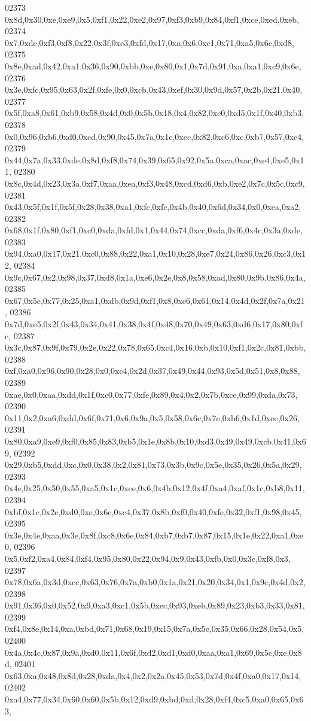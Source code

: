 \begin{DoxyCode}
02373   0x8d,0x30,0xe,0xe9,0x5,0xf1,0x22,0xe2,0x97,0xf3,0xb9,0x84,0xf1,0xce,0xed,0xeb,
02374   0x7,0xdc,0xf3,0xf8,0x22,0x3f,0xe3,0xfd,0x17,0xa,0x6,0xc1,0x71,0xa5,0x6c,0xd8,
02375   0x8e,0xad,0x42,0xa1,0x36,0x90,0xbb,0xe,0x80,0x1,0x7d,0x91,0xa,0xa1,0xc9,0x6e,
02376   0x3e,0xfc,0x95,0x63,0x2f,0xfe,0x0,0xcb,0x43,0xef,0x30,0x9d,0x57,0x2b,0x21,0x40,
02377   0x5f,0xa8,0x61,0xb9,0x58,0x4d,0x0,0x5b,0x18,0x4,0x82,0xc0,0xd5,0x1f,0x40,0xb3,
02378   0x0,0x96,0xb6,0xd0,0xcd,0x90,0x45,0x7a,0x1e,0xec,0x82,0xc6,0xc,0xb7,0x57,0xe4,
02379   0x44,0x7a,0x33,0xde,0x8d,0xf8,0x74,0x39,0x65,0x92,0x5a,0xca,0xac,0xe4,0xe5,0x11,
02380   0x8c,0x4d,0x23,0x3a,0xf7,0xaa,0xea,0xf3,0x48,0xcd,0xd6,0xb,0xe2,0x7c,0x5c,0xc9,
02381   0x43,0x5f,0x1f,0x5f,0x28,0x38,0xa1,0xfc,0xfc,0x4b,0x40,0x6d,0x34,0x0,0xea,0xa2,
02382   0x68,0x1f,0x80,0xf1,0xc0,0xda,0xfd,0x1,0x44,0x74,0xcc,0xda,0xf6,0x4c,0x3a,0xde,
02383   0x94,0xa0,0x17,0x21,0xc0,0x88,0x22,0xa1,0x10,0x28,0xe7,0x24,0x86,0x26,0xc3,0x12,
02384   0x9c,0x67,0x2,0x98,0x37,0xd8,0x1a,0xe6,0x2e,0x8,0x58,0xad,0x80,0x9b,0x86,0x4a,
02385   0x67,0x5e,0x77,0x25,0xa1,0xdb,0x9d,0xf1,0x8,0xe6,0x61,0x14,0x4d,0x2f,0x7a,0x21,
02386   0x7d,0xe5,0x2f,0x43,0x34,0x41,0x38,0x4f,0x48,0x70,0x49,0x63,0xd6,0x17,0x80,0xfc,
02387   0x3c,0x87,0x9f,0x79,0x2e,0x22,0x78,0x65,0xc4,0x16,0xb,0x10,0xf1,0x2c,0x81,0xbb,
02388   0xf,0xa0,0x96,0x90,0x28,0x0,0xc4,0x2d,0x37,0x49,0x44,0x93,0x5d,0x51,0x8,0x88,
02389   0xae,0x0,0xaa,0xdd,0x1f,0xc0,0x77,0xfe,0x89,0x4,0x2,0x7b,0xce,0x99,0xda,0x73,
02390   0x11,0x2,0xa6,0xdd,0x6f,0x71,0x6,0x9a,0x5,0x58,0x6c,0x7e,0xb6,0x1d,0xee,0x26,
02391   0x80,0xa9,0xe9,0xf0,0x85,0x83,0xb5,0x1e,0x8b,0x10,0xd3,0x49,0x49,0xcb,0x41,0x69,
02392   0x29,0xb5,0xdd,0xc,0x0,0x38,0x2,0x81,0x73,0x3b,0x9c,0x5e,0x35,0x26,0x5a,0x29,
02393   0x4e,0x25,0x50,0x55,0xa5,0x1c,0xee,0x6,0x4b,0x12,0x4f,0xa4,0xaf,0x1c,0xb8,0x11,
02394   0xbf,0x1c,0x2e,0xd0,0xe,0x6c,0xc4,0x37,0x8b,0xf0,0x40,0xfe,0x32,0xf1,0x98,0x45,
02395   0x3e,0x4e,0xaa,0x3e,0x8f,0xc8,0x6e,0x84,0xb7,0xb7,0x87,0x15,0x1e,0x22,0xa1,0xe0,
02396   0x5,0xf2,0xa4,0x84,0xf4,0x95,0x80,0x22,0x94,0x9,0x43,0xfb,0x0,0x3c,0xf8,0x3,
02397   0x78,0x6a,0x3d,0xcc,0x63,0x76,0x7a,0xb0,0x1a,0x21,0x20,0x34,0x1,0x9c,0x4d,0x2,
02398   0x91,0x36,0x0,0x52,0x9,0xa3,0xc1,0x5b,0xec,0x93,0xeb,0x89,0x23,0xb3,0x33,0x81,
02399   0xf4,0x8e,0x14,0xa,0xbd,0x71,0x68,0x19,0x15,0x7a,0x5e,0x35,0x66,0x28,0x54,0x5,
02400   0x4a,0x4c,0x87,0x9a,0xd0,0x11,0x6f,0xd2,0xd1,0xd0,0xaa,0xa1,0x69,0x5c,0xe,0x8d,
02401   0x63,0xa,0x48,0x8d,0x28,0xda,0x4,0x2,0x2a,0x45,0x53,0x7d,0x4f,0xa0,0x17,0x14,
02402   0xa4,0x77,0x34,0x60,0x60,0x5b,0x12,0xd9,0xbd,0xd,0x28,0xf4,0xc5,0xa0,0x65,0x63,

\end{DoxyCode}
